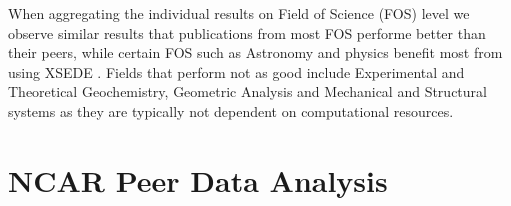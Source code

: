 \documentclass[10pt, conference, compsocconf]{IEEEtran}
\begin{document}
When aggregating the individual results on Field of Science (FOS) level we observe similar results that publications from most FOS performe better than their peers, while certain FOS such as Astronomy and physics benefit most from using XSEDE \cite{las15cluster-long,las15xsede}. Fields that perform not as good include Experimental and Theoretical Geochemistry, Geometric Analysis and Mechanical and Structural systems as they are typically not dependent on computational resources.

\section{NCAR Peer Data Analysis}\label{S:ncar}

\end{document}
